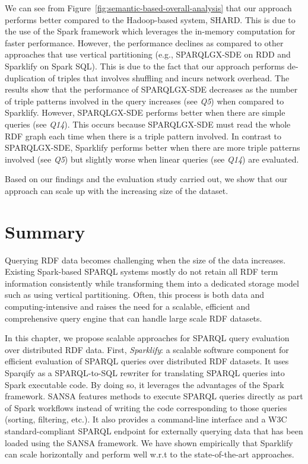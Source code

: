 We can see from Figure~\ref{fig:semantic-based-overall-analysis} that our approach performs better compared to the Hadoop-based system, SHARD. 
This is due to the use of the Spark framework which leverages the in-memory computation for faster performance.
However, the performance declines as compared to other approaches that use vertical partitioning (e.g., SPARQLGX-SDE on \gls{RDD} and Sparklify on Spark SQL).
This is due to the fact that our approach performs de-duplication of triples that involves shuffling and incurs network overhead.
The results show that the performance of SPARQLGX-SDE decreases as the number of triple patterns involved in the query increases (see \textit{Q5}) when compared to Sparklify. 
However, SPARQLGX-SDE performs better when there are simple queries (see \textit{Q14}). 
This occurs because SPARQLGX-SDE must read the whole RDF graph each time when there is a triple pattern involved.
In contrast to SPARQLGX-SDE, Sparklify performs better when there are more triple patterns involved (see \textit{Q5}) but slightly worse when linear queries (see \textit{Q14}) are evaluated. 

Based on our findings and the evaluation study carried out, we show that our approach can scale up with the increasing size of the dataset.

\section{Summary}
\label{sec:scalable-rdf-querying-summary}
Querying \gls{RDF} data becomes challenging when the size of the data increases.
Existing Spark-based \gls{SPARQL} systems mostly
do not retain all \gls{RDF} term information consistently while transforming them into a dedicated storage model such as using vertical partitioning.
Often, this process is both data and computing-intensive and raises the need for a scalable, efficient and comprehensive query engine that can handle large scale \gls{RDF} datasets.

In this chapter, we propose scalable approaches for \gls{SPARQL} query evaluation over distributed \gls{RDF} data. 
First, \emph{Sparklify}: a scalable software component for efficient evaluation of \gls{SPARQL} queries over distributed \gls{RDF} datasets. 
It uses Sparqify as a SPARQL-to-SQL rewriter for translating \gls{SPARQL} queries into Spark executable code.
By doing so, it leverages the advantages of the Spark framework.
SANSA features methods to execute \gls{SPARQL} queries directly as part of Spark workflows instead of writing the code corresponding to those queries (sorting, filtering, etc.).
It also provides a command-line interface and a \gls{W3C} standard-compliant \gls{SPARQL} endpoint for externally querying data that has been loaded using the SANSA framework.
We have shown empirically that Sparklify can scale horizontally and perform well w.r.t to the state-of-the-art approaches.

